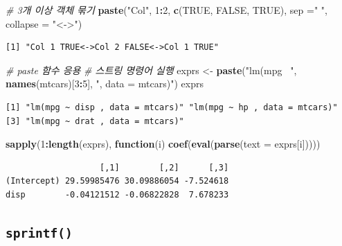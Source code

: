 \documentclass[
  11pt,
]{krantz}
\newenvironment{Shaded}{\begin{snugshade}}{\end{snugshade}}
\newcommand{\CommentTok}[1]{\textcolor[rgb]{0.37,0.37,0.37}{\textit{#1}}}
\newcommand{\ControlFlowTok}[1]{\textcolor[rgb]{0.27,0.27,0.27}{\textbf{#1}}}
\newcommand{\DataTypeTok}[1]{\textcolor[rgb]{0.27,0.27,0.27}{#1}}
\newcommand{\DecValTok}[1]{\textcolor[rgb]{0.06,0.06,0.06}{#1}}
\newcommand{\KeywordTok}[1]{\textcolor[rgb]{0.27,0.27,0.27}{\textbf{#1}}}
\newcommand{\NormalTok}[1]{#1}
\newcommand{\OperatorTok}[1]{\textcolor[rgb]{0.43,0.43,0.43}{\textbf{#1}}}
\newcommand{\OtherTok}[1]{\textcolor[rgb]{0.37,0.37,0.37}{#1}}
\newcommand{\StringTok}[1]{\textcolor[rgb]{0.5,0.5,0.5}{#1}}
\begin{document}
\begin{Shaded}
\begin{Highlighting}[]
\CommentTok{# 3개 이상 객체 묶기}
\KeywordTok{paste}\NormalTok{(}\StringTok{"Col"}\NormalTok{, }\DecValTok{1}\OperatorTok{:}\DecValTok{2}\NormalTok{, }\KeywordTok{c}\NormalTok{(}\OtherTok{TRUE}\NormalTok{, }\OtherTok{FALSE}\NormalTok{, }\OtherTok{TRUE}\NormalTok{), }\DataTypeTok{sep =}\StringTok{" "}\NormalTok{, }\DataTypeTok{collapse =} \StringTok{"<->"}\NormalTok{)}
\end{Highlighting}
\end{Shaded}

\begin{verbatim}
[1] "Col 1 TRUE<->Col 2 FALSE<->Col 1 TRUE"
\end{verbatim}

\begin{Shaded}
\begin{Highlighting}[]
\CommentTok{# paste 함수 응용}
\CommentTok{# 스트링 명령어 실행 }
\NormalTok{exprs <-}\StringTok{ }\KeywordTok{paste}\NormalTok{(}\StringTok{"lm(mpg ~"}\NormalTok{, }\KeywordTok{names}\NormalTok{(mtcars)[}\DecValTok{3}\OperatorTok{:}\DecValTok{5}\NormalTok{], }\StringTok{", data = mtcars)"}\NormalTok{)}
\NormalTok{exprs}
\end{Highlighting}
\end{Shaded}

\begin{verbatim}
[1] "lm(mpg ~ disp , data = mtcars)" "lm(mpg ~ hp , data = mtcars)"  
[3] "lm(mpg ~ drat , data = mtcars)"
\end{verbatim}

\begin{Shaded}
\begin{Highlighting}[]
\KeywordTok{sapply}\NormalTok{(}\DecValTok{1}\OperatorTok{:}\KeywordTok{length}\NormalTok{(exprs), }\ControlFlowTok{function}\NormalTok{(i) }\KeywordTok{coef}\NormalTok{(}\KeywordTok{eval}\NormalTok{(}\KeywordTok{parse}\NormalTok{(}\DataTypeTok{text =}\NormalTok{ exprs[i]))))}
\end{Highlighting}
\end{Shaded}

\begin{verbatim}
                   [,1]        [,2]      [,3]
(Intercept) 29.59985476 30.09886054 -7.524618
disp        -0.04121512 -0.06822828  7.678233
\end{verbatim}

\normalsize

\hypertarget{sprintf}{%
\subsection{\texorpdfstring{\textbf{\texttt{sprintf()}}}{sprintf()}}\label{sprintf}}
\end{document}
